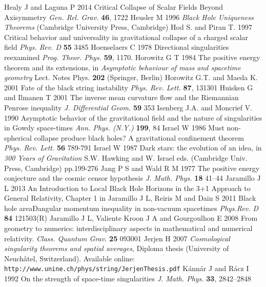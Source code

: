 \documentclass[12pt]{iopart}
\begin{document}
\begin{thebibliography}{999}
 Healy J and Laguna P 2014 Critical Collapse of Scalar Fields Beyond Axisymmetry  {\it Gen. Rel. Grav.} {\bf 46}, 1722
 Heusler M 1996 {\it Black Hole Uniqueness Theorems} (Cambridge University Press, Cambridge)
 Hod S. and Piran T. 1997 Critical behavior and universality in gravitational collapse of a charged scalar field {\it Phys. Rev. D} {\bf 55} 3485
 Hoenselaers C 1978 Directional singularities reexamined {\it Prog. Theor. Phys.} {\bf 59},
1170.%
 Horowitz G T 1984 The positive energy theorem and its extensions, in {\it Asymptotic behaviour of mass and spacetime geometry} Lect. Notes Phys. {\bf 202} (Springer, Berlin)
 Horowitz G.T. and Maeda K. 2001 Fate of the black string instability {\it Phys. Rev. Lett.} {\bf 87}, 131301
 Huisken G and Ilmanen T 2001 The inverse mean curvature flow and the Riemannian Penrose inequality {\it J. Differential Geom.} {\bf 59} 353 
 Isenberg J.A. and Moncrief V. 1990 Asymptotic behavior of the gravitational field and the nature of singularities in Gowdy space-times {\it Ann. Phys. (N.Y.)} {\bf 199}, 84
 Israel W 1986 Must non-spherical collapse produce black holes? A gravitational confinement theorem {\it Phys. Rev. Lett.} {\bf 56} 789-791
 Israel W 1987 Dark stars: the evolution of an idea, in {\it 300 Years of Gravitation} S.W. Hawking and W.
Israel eds. (Cambridge Univ. Press, Cambridge) pp.199-276%
 Jang P S and Wald R M 1977 The positive energy conjecture and the cosmic censor hypothesis {\it J. Math. Phys.} {\bf  18} 41--44
 Jaramillo J L 2013 An Introduction to Local Black Hole Horizons in the 3+1
Approach to General Relativity, Chapter 1 in \cite{HayBook}
 Jaramillo J L, Reiris M and Dain S 2011 Black hole areaÐangular momentum inequality in non-vacuum spacetimes {\it Phys.Rev. D} {\bf 84} 121503(R) 
 Jaramillo J L, Valiente Kroon J A and Gourgoulhon E 2008
From geometry to numerics: interdisciplinary aspects in mathematical and numerical relativity.
{\it Class. Quantum Grav.} {\bf 25} 093001
 Jerjen H 2007 {\it Cosmological singularity theorems and spatial averages}, Diploma thesis (University of Neuch\^atel, Switzerland). Available online: {\tt http://www.unine.ch/phys/string/JerjenThesis.pdf}
 K\'ann\'ar J and R\'acz I 1992 On the strength of space-time singularities {\it J. Math. Phys.} {\bf 33},
2842--2848%

\end{thebibliography}
\end{document}
